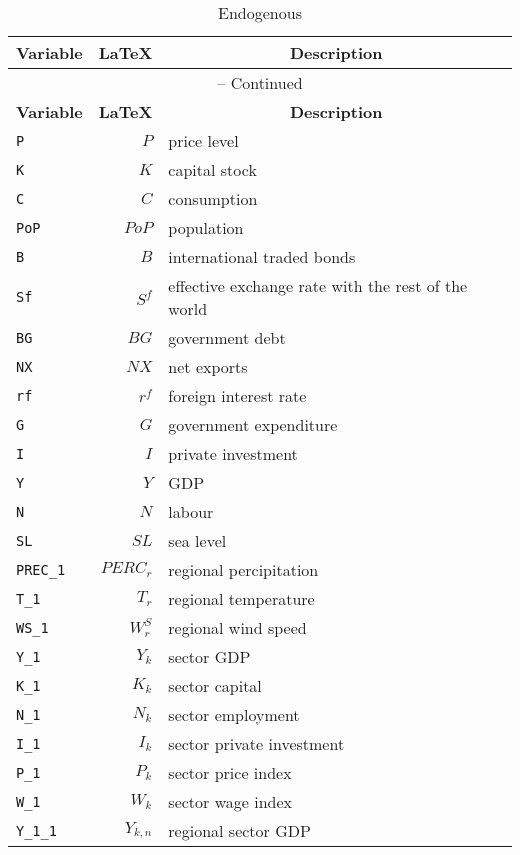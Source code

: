 \begin{center}
\begin{longtable}{lrl}
\caption{Endogenous}\\%
\hline%
\multicolumn{1}{c}{\textbf{Variable}} &
\multicolumn{1}{c}{\textbf{\LaTeX}} &
\multicolumn{1}{c}{\textbf{Description}}\\%
\hline\hline%
\endfirsthead
\multicolumn{3}{c}{{\tablename} \thetable{} -- Continued}\\%
\hline%
\multicolumn{1}{c}{\textbf{Variable}} &
\multicolumn{1}{c}{\textbf{\LaTeX}} &
\multicolumn{1}{c}{\textbf{Description}}\\%
\hline\hline%
\endhead
\texttt{P} & $P$ & price level\\
\texttt{K} & $K$ & capital stock\\
\texttt{C} & $C$ & consumption\\
\texttt{PoP} & $PoP$ & population\\
\texttt{B} & $B$ & international traded bonds\\
\texttt{Sf} & $S^{f}$ & effective exchange rate with the rest of the world\\
\texttt{BG} & $BG$ & government debt\\
\texttt{NX} & $NX$ & net exports\\
\texttt{rf} & ${r^{f}}$ & foreign interest rate\\
\texttt{G} & $G$ & government expenditure\\
\texttt{I} & $I$ & private investment\\
\texttt{Y} & $Y$ & GDP\\
\texttt{N} & $N$ & labour\\
\texttt{SL} & ${SL}$ & sea level\\
\texttt{PREC\_1} & ${PERC_{r}}$ & regional percipitation\\
\texttt{T\_1} & ${T_{r}}$ & regional temperature\\
\texttt{WS\_1} & ${W_{r}^{S}}$ & regional wind speed\\
\texttt{Y\_1} & ${Y_k}$ & sector GDP\\
\texttt{K\_1} & ${K_k}$ & sector capital\\
\texttt{N\_1} & ${N_k}$ & sector employment\\
\texttt{I\_1} & ${I_k}$ & sector private investment\\
\texttt{P\_1} & ${P_k}$ & sector price index\\
\texttt{W\_1} & ${W_k}$ & sector wage index\\
\texttt{Y\_1\_1} & ${Y_{k,n}}$ & regional sector GDP\\

\end{longtable}
\end{center}
